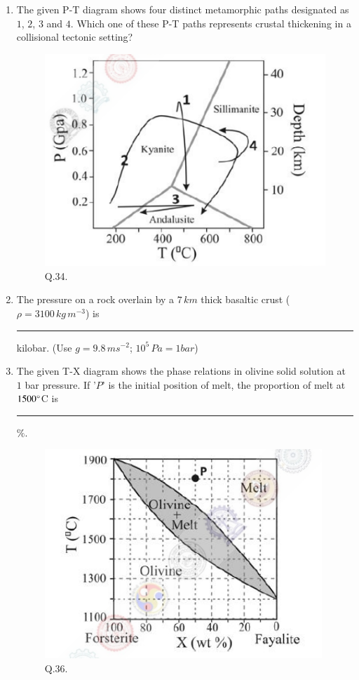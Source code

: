 \documentclass[journal,12pt,onecolumn]{IEEEtran}
\theoremstyle{remark}
\begin{document}
\begin{enumerate}
    \item The given P-T diagram shows four distinct metamorphic paths designated as $1$, $2$, $3$ and $4$. Which one of these P-T paths represents crustal thickening in a collisional tectonic setting? \hfill{}
        \begin{figure}[h]
            \centering
            \includegraphics[width=0.5\columnwidth]{Figs/fig_4.png}
            \caption{Q.34.}
            \label{fig:placeholder_4}
        \end{figure}
        \begin{enumerate} 
        \end{enumerate}
    
    \item The pressure on a rock overlain by a $7\,km$ thick basaltic crust ($\rho=3100\,kg\,m^{-3}$) is \rule{3cm}{0.15mm} kilobar. (Use $g=9.8\,ms^{-2}$; $10^5\,Pa=1 bar$) \hfill{}
    
    \item The given T-X diagram shows the phase relations in olivine solid solution at $1$ bar pressure. If '$P$' is the initial position of melt, the proportion of melt at $1500\degree$C is \rule{3cm}{0.15mm}$\%$. \hfill{}
        \begin{figure}[h]
            \centering
            \includegraphics[width=0.5\columnwidth]{Figs/fig_5.png}
            \caption{Q.36.}
            \label{fig:placeholder_5}
        \end{figure}
    

\end{enumerate}
\end{document}
